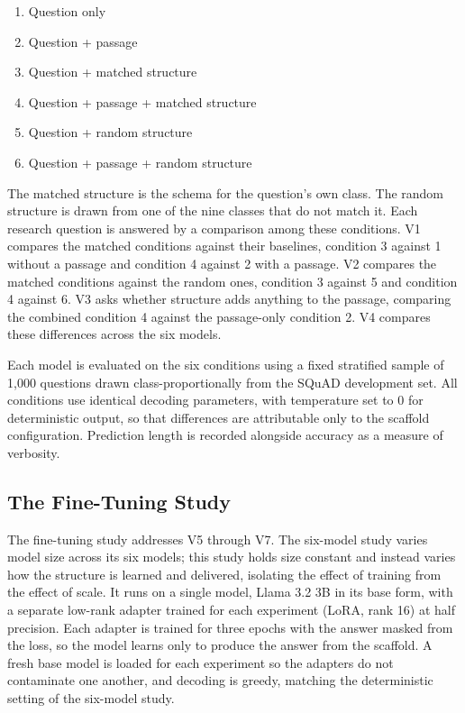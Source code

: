 \documentclass{article}
\begin{document}
\begin{enumerate}
  \item Question only
  \item Question + passage
  \item Question + matched structure
  \item Question + passage + matched structure
  \item Question + random structure
  \item Question + passage + random structure
\end{enumerate}

The matched structure is the schema for the question's own class. The random structure is drawn from one of the nine classes that do not match it. Each research question is answered by a comparison among these conditions. V1 compares the matched conditions against their baselines, condition 3 against 1 without a passage and condition 4 against 2 with a passage. V2 compares the matched conditions against the random ones, condition 3 against 5 and condition 4 against 6. V3 asks whether structure adds anything to the passage, comparing the combined condition 4 against the passage-only condition 2. V4 compares these differences across the six models.

Each model is evaluated on the six conditions using a fixed stratified sample of 1,000 questions drawn class-proportionally from the SQuAD development set. All conditions use identical decoding parameters, with temperature set to 0 for deterministic output, so that differences are attributable only to the scaffold configuration. Prediction length is recorded alongside accuracy as a measure of verbosity.

\subsection{The Fine-Tuning Study}

The fine-tuning study addresses V5 through V7. The six-model study varies model size across its six models; this study holds size constant and instead varies how the structure is learned and delivered, isolating the effect of training from the effect of scale. It runs on a single model, Llama 3.2 3B in its base form, with a separate low-rank adapter trained for each experiment (LoRA, rank 16) at half precision. Each adapter is trained for three epochs with the answer masked from the loss, so the model learns only to produce the answer from the scaffold. A fresh base model is loaded for each experiment so the adapters do not contaminate one another, and decoding is greedy, matching the deterministic setting of the six-model study.
\end{document}
